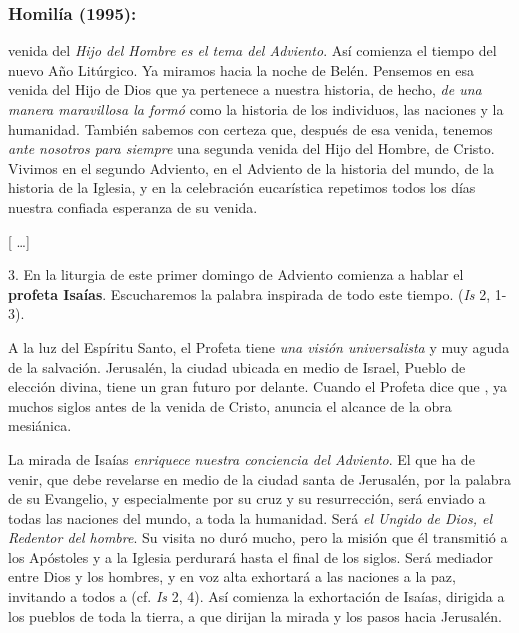 			\subsubsection{Homilía (1995):}
		
		
				\begin{body}
					 venida del \emph{Hijo del Hombre es el tema del Adviento}. Así comienza el tiempo del nuevo Año Litúrgico. Ya miramos hacia la noche de Belén. Pensemos en esa venida del Hijo de Dios que ya pertenece a nuestra historia, de hecho, \emph{de una manera maravillosa la formó} como la historia de los individuos, las naciones y la humanidad. También sabemos con certeza que, después de esa venida, tenemos \emph{ante nosotros para siempre} una segunda venida del Hijo del Hombre, de Cristo. Vivimos en el segundo Adviento, en el Adviento de la historia del mundo, de la historia de la Iglesia, y en la celebración eucarística repetimos todos los días nuestra confiada esperanza de su venida.	 
					
					{[} \ldots{}{]} 
					
					3. En la liturgia de este primer domingo de Adviento comienza a hablar el \textbf{profeta Isaías}. Escucharemos la palabra inspirada de todo este tiempo.  (\emph{Is} 2, 1-3). 
					
					A la luz del Espíritu Santo, el Profeta tiene \emph{una visión universalista} y muy aguda de la salvación. Jerusalén, la ciudad ubicada en medio de Israel, Pueblo de elección divina, tiene un gran futuro por delante. Cuando el Profeta dice que , ya muchos siglos antes de la venida de Cristo, anuncia el alcance de la obra mesiánica. 
					
					La mirada de Isaías \emph{enriquece nuestra conciencia del Adviento}. El que ha de venir, que debe revelarse  en medio de la ciudad santa de Jerusalén, por la palabra de su Evangelio, y especialmente por su cruz y su resurrección, será enviado a todas las naciones del mundo, a toda la humanidad. Será \emph{el Ungido de Dios, el Redentor del hombre}. Su visita no duró mucho, pero la misión que él transmitió a los Apóstoles y a la Iglesia perdurará hasta el final de los siglos. Será mediador entre Dios y los hombres, y en voz alta exhortará a las naciones a la paz, invitando a todos a  (cf. \emph{Is} 2, 4). Así comienza la exhortación de Isaías, dirigida a los pueblos de toda la tierra, a que dirijan la mirada y los pasos hacia Jerusalén. 
					

\end{body}
